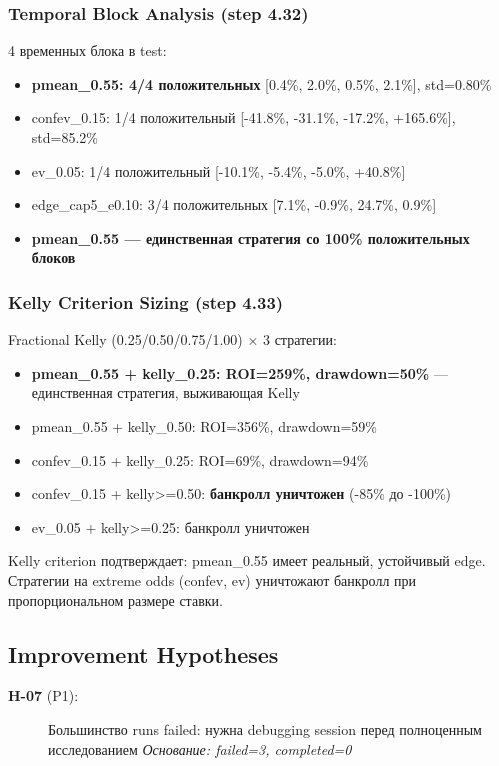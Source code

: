 \documentclass[12pt,a4paper]{article}
\begin{document}
\subsubsection{Temporal Block Analysis (step 4.32)}
4 временных блока в test:
\begin{itemize}
  \item \textbf{pmean\_0.55: 4/4 положительных} [0.4\%, 2.0\%, 0.5\%, 2.1\%], std=0.80\%
  \item confev\_0.15: 1/4 положительный [-41.8\%, -31.1\%, -17.2\%, +165.6\%], std=85.2\%
  \item ev\_0.05: 1/4 положительный [-10.1\%, -5.4\%, -5.0\%, +40.8\%]
  \item edge\_cap5\_e0.10: 3/4 положительных [7.1\%, -0.9\%, 24.7\%, 0.9\%]
  \item \textbf{pmean\_0.55 — единственная стратегия со 100\% положительных блоков}
\end{itemize}

\subsubsection{Kelly Criterion Sizing (step 4.33)}
Fractional Kelly (0.25/0.50/0.75/1.00) × 3 стратегии:
\begin{itemize}
  \item \textbf{pmean\_0.55 + kelly\_0.25: ROI=259\%, drawdown=50\%} — единственная стратегия, выживающая Kelly
  \item pmean\_0.55 + kelly\_0.50: ROI=356\%, drawdown=59\%
  \item confev\_0.15 + kelly\_0.25: ROI=69\%, drawdown=94\%
  \item confev\_0.15 + kelly>=0.50: \textbf{банкролл уничтожен} (-85\% до -100\%)
  \item ev\_0.05 + kelly>=0.25: банкролл уничтожен
\end{itemize}

Kelly criterion подтверждает: pmean\_0.55 имеет реальный, устойчивый edge.
Стратегии на extreme odds (confev, ev) уничтожают банкролл при пропорциональном размере ставки.




\subsection{Improvement Hypotheses}

\begin{description}
    \item[\textbf{H-07} (P1):] Большинство runs failed: нужна debugging session перед полноценным исследованием
    \textit{Основание: failed=3, completed=0}
\end{description}
\end{document}
